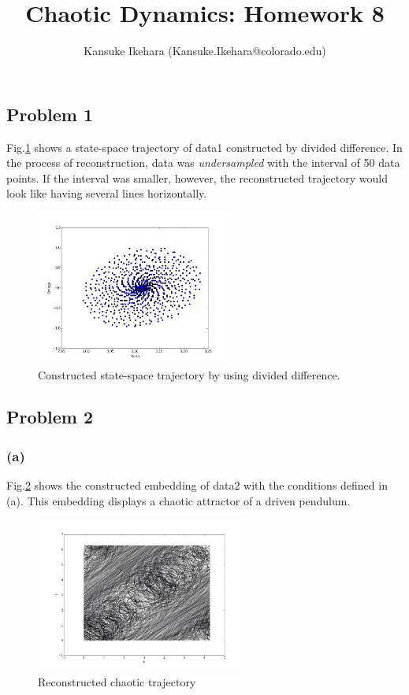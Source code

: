 \documentclass{article}
\title{Chaotic Dynamics: Homework 8}
\author{Kansuke Ikehara (Kansuke.Ikehara@colorado.edu)}
\begin{document}
\maketitle

\subsection*{Problem 1}
Fig.\ref{q1a} shows a state-space trajectory of data1 constructed by divided difference.  In the process of reconstruction, data was \textit{undersampled} with the interval of 50 data points. If the interval was smaller, however, the reconstructed trajectory would look like having several lines horizontally.
\begin{figure}[h]
  \centering
  \includegraphics[height=2in]{figs/q1_interval_50.png}
  \caption{Constructed state-space trajectory by using divided difference.}
  \label{q1a}
\end{figure}

\subsection*{Problem 2}
\subsubsection*{(a)}
Fig.\ref{q2a} shows the constructed embedding of data2 with the conditions defined in (a). This embedding displays a chaotic attractor of a driven pendulum. 
\begin{figure}[h]
  \centering
  \includegraphics[height=2in]{figs/q2a.png}
  \caption{Reconstructed chaotic trajectory}
  \label{q2a}
\end{figure}
\end{document}
